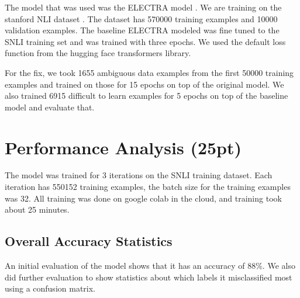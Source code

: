 \documentclass[twocolumn]{article}
\begin{document}
The model that was used was the ELECTRA model \cite{clark2020electra}. We are
training  on the stanford NLI dataset \cite{bowman2015large}. The dataset has
570000 training examples and 10000 validation examples. The baseline ELECTRA
modeled was fine tuned to the SNLI training set and was trained with three
epochs. We used the default loss function from the hugging face transformers
library. 

For the fix, we took 1655 ambiguous data examples from the first 50000 training
examples and trained on those for 15 epochs on top of the original model. We
also trained 6915 difficult to learn examples for 5 epochs on top of the
baseline model and evaluate that.


\section{Performance Analysis (25pt)}

The model was trained for 3 iterations on the SNLI training dataset. Each
iteration has 550152 training examples, the batch size for the training examples
was 32. All training was done on google colab in the cloud, and training took
about 25 minutes.

\subsection*{Overall Accuracy Statistics}

An initial evaluation of the model shows that it has an accuracy of 88\%. We
also did further evaluation to show statistics about which labels it
misclassified most using a confusion matrix.
\end{document}

